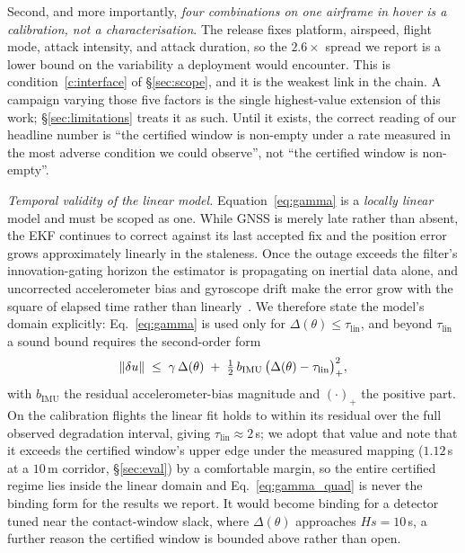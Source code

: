 Second, and more importantly, \emph{four combinations on one airframe in hover
is a calibration, not a characterisation}. The release fixes platform, airspeed,
flight mode, attack intensity, and attack duration, so the $2.6\times$ spread we
report is a lower bound on the variability a deployment would encounter. This is
condition~\ref{c:interface} of \S\ref{sec:scope}, and it is the weakest link in
the chain. A campaign varying those five factors is the single highest-value
extension of this work; \S\ref{sec:limitations} treats it as such. Until it
exists, the correct reading of our headline number is ``the certified window is
non-empty under a rate measured in the most adverse condition we could
observe'', not ``the certified window is non-empty''.

\emph{Temporal validity of the linear model.} Equation~\eqref{eq:gamma} is a
\emph{locally linear} model and must be scoped as one. While GNSS is merely
late rather than absent, the EKF continues to correct against its last accepted
fix and the position error grows approximately linearly in the staleness. Once
the outage exceeds the filter's innovation-gating horizon the estimator is
propagating on inertial data alone, and uncorrected accelerometer bias and
gyroscope drift make the error grow with the square of elapsed time rather than
linearly~\cite{kong2024px4ekf}. We therefore state the model's domain
explicitly: Eq.~\eqref{eq:gamma} is used only for
$\Delta(\theta)\le\tau_{\mathrm{lin}}$, and beyond $\tau_{\mathrm{lin}}$ a
sound bound requires the second-order form
\begin{equation}
\label{eq:gamma_quad}
\left\lVert \delta u\right\rVert\;\le\;\gamma\,\Delta(\theta)\;+\;\tfrac12\,b_{\mathrm{IMU}}\,\big(\Delta(\theta)-\tau_{\mathrm{lin}}\big)_{+}^{2},
\end{equation}
with $b_{\mathrm{IMU}}$ the residual accelerometer-bias magnitude and
$(\cdot)_+$ the positive part. On the calibration flights the linear fit holds
to within its residual over the full observed degradation interval, giving
$\tau_{\mathrm{lin}}\approx2$\,s; we adopt that value and note that it
exceeds the certified window's upper edge under the measured mapping
($1.12$\,s at a $10$\,m corridor, \S\ref{sec:eval}) by a comfortable margin,
so the entire certified regime lies inside the linear domain and
Eq.~\eqref{eq:gamma_quad} is never the binding form for the results we report. It
would become binding for a detector tuned near the contact-window slack, where
$\Delta(\theta)$ approaches $Hs=10$\,s, a further reason the certified window
is bounded above rather than open.

